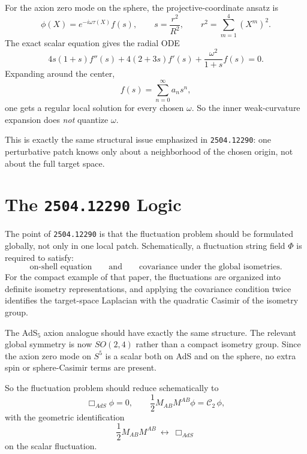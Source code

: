 \documentclass[12pt]{article}
\newcommand{\cC}{\mathcal{C}}
\begin{document}
For the axion zero mode on the sphere, the projective-coordinate ansatz is
\begin{equation}
\phi(X)=e^{-i\omega\tau(X)}f(s),
\qquad
s=\frac{r^2}{R^2},
\qquad
r^2=\sum_{m=1}^4 (X^m)^2.
\end{equation}
The exact scalar equation gives the radial ODE
\begin{equation}
4s(1+s)f''(s)+4(2+3s)f'(s)+\frac{\omega^2}{1+s}f(s)=0.
\label{radialode}
\end{equation}
Expanding around the center,
\begin{equation}
f(s)=\sum_{n=0}^{\infty} a_n s^n,
\end{equation}
one gets a regular local solution for every chosen $\omega$.  So the inner weak-curvature expansion does
\emph{not} quantize $\omega$.

This is exactly the same structural issue emphasized in \texttt{2504.12290}: one perturbative patch knows
only about a neighborhood of the chosen origin, not about the full target space.

\section{The \texttt{2504.12290} Logic}

The point of \texttt{2504.12290} is that the fluctuation problem should be formulated globally, not only in
one local patch.  Schematically, a fluctuation string field $\Phi$ is required to satisfy:
\begin{equation}
\text{on-shell equation}
\qquad\text{and}\qquad
\text{covariance under the global isometries.}
\end{equation}
For the compact example of that paper, the fluctuations are organized into definite isometry
representations, and applying the covariance condition twice identifies the target-space Laplacian with the
quadratic Casimir of the isometry group.

The AdS$_5$ axion analogue should have exactly the same structure.  The relevant global symmetry is now
$SO(2,4)$ rather than a compact isometry group.  Since the axion zero mode on $S^5$ is a scalar both on
AdS and on the sphere, no extra spin or sphere-Casimir terms are present.

So the fluctuation problem should reduce schematically to
\begin{equation}
\Box_{AdS}\phi=0,
\qquad
\frac12 M_{AB}M^{AB}\phi=\cC_2\,\phi,
\label{schematic}
\end{equation}
with the geometric identification
\begin{equation}
\frac12 M_{AB}M^{AB}\ \leftrightarrow\ \Box_{AdS}
\end{equation}
on the scalar fluctuation.
\end{document}
